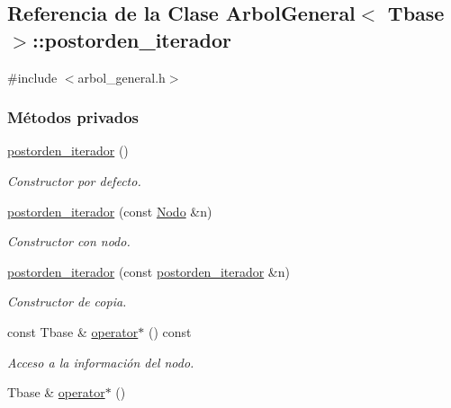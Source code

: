 \hypertarget{classArbolGeneral_1_1postorden__iterador}{}\subsection{Referencia de la Clase Arbol\+General$<$ Tbase $>$\+:\+:postorden\+\_\+iterador}
\label{classArbolGeneral_1_1postorden__iterador}


{\ttfamily \#include $<$arbol\+\_\+general.\+h$>$}

\subsubsection*{Métodos privados}
\begin{DoxyCompactItemize}
\item 
\hyperlink{classArbolGeneral_1_1postorden__iterador_a2ac2dbbaf71087cf7d5964b45b4bca1e}{postorden\+\_\+iterador} ()
\begin{DoxyCompactList}\small\item\em Constructor por defecto. \end{DoxyCompactList}\item 
\hyperlink{classArbolGeneral_1_1postorden__iterador_a40c1929529a5d1063e97c07a73ecb043}{postorden\+\_\+iterador} (const \hyperlink{classArbolGeneral_a12cc1b74a9095d89bc7334290d332f7a}{Nodo} \&n)
\begin{DoxyCompactList}\small\item\em Constructor con nodo. \end{DoxyCompactList}\item 
\hyperlink{classArbolGeneral_1_1postorden__iterador_a07bc1d0276eb14be207144f0a69745d3}{postorden\+\_\+iterador} (const \hyperlink{classArbolGeneral_1_1postorden__iterador}{postorden\+\_\+iterador} \&n)
\begin{DoxyCompactList}\small\item\em Constructor de copia. \end{DoxyCompactList}\item 
const Tbase \& \hyperlink{classArbolGeneral_1_1postorden__iterador_aa42543b192361b8ea90e115a0ed99cab}{operator$\ast$} () const
\begin{DoxyCompactList}\small\item\em Acceso a la información del nodo. \end{DoxyCompactList}\item 
Tbase \& \hyperlink{classArbolGeneral_1_1postorden__iterador_af0f0fcc363dd30b5b0d102c1b60817c3}{operator$\ast$} ()

\end{DoxyCompactItemize}
